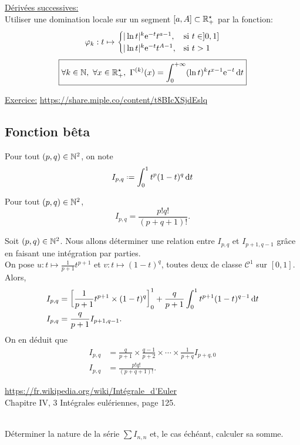 \underline{Dérivées successives:} \\
Utiliser une domination locale sur un segment $[a, A] \subset \mathbb{R}_+^\star$ par la fonction:
$$\varphi_k:t \mapsto 
\begin{cases}
    |\ln t |^k \mathrm{e}^{-t} t^{a-1}, & \text{si } t \in ]0, 1] \\
    |\ln t |^k \mathrm{e}^{-t} t^{A-1}, & \text{si } t > 1
\end{cases}
$$
$$\boxed{\forall k \in \mathbb{N},\ \forall x \in \mathbb{R}_+^\star,\ \Gamma^{(k)}(x) = \int_{0}^{+\infty} (\ln t)^k t^{x-1} \mathrm{e}^{-t} \, \mathrm{d} t}$$

\underline{Exercice:} \url{https://share.miple.co/content/t8BIcXSjdEslq}

\subsection{Fonction bêta}
\begin{defi}
    Pour tout $(p,q) \in \mathbb{N}^2$, on note
    $$I_{p,q} \defeq \int_{0}^{1} t^p (1-t)^q \d t$$
\end{defi}

\begin{prop}
    Pour tout $(p,q) \in \mathbb{N}^2$,
    $$I_{p,q} = \frac{p! q!}{(p + q + 1)!}.$$
\end{prop}

\begin{preuve}
    Soit $(p,q) \in \mathbb{N}^2$. Nous allons déterminer une relation entre $I_{p,q}$ et $I_{p+1, q-1}$ grâce en faisant une intégration par parties. \\
    On pose $u:t\mapsto \frac{1}{p+1} t^{p+1}$ et $v:t\mapsto (1-t)^q$, toutes deux de classe $\mathscr{C}^1$ sur $[0, 1]$. Alors, 
    \begin{align*}
        I_{p,q} &= \left[ \frac{1}{p+1}t^{p+1} \times (1-t)^q \right]_0^1 + \frac{q}{p+1} \int_0^1 t^{p+1} (1-t)^{q-1} \, \mathrm{d} t \\
        I_{p,q} &= \frac{q}{p+1} I_{p+1, q-1}.
    \end{align*}
    On en déduit que 
    \begin{align*}
        I_{p,q} &= \frac{q}{p+1} \times \frac{q-1}{p+2} \times \cdots \times \frac{1}{p+q} I_{p+q,0} \\
        I_{p,q} &= \frac{p! q!}{(p + q + 1)!}.
    \end{align*}
\end{preuve}

\url{https://fr.wikipedia.org/wiki/Intégrale_d'Euler} \\
\cite{calcul_infinitesimal} Chapitre IV, 3 Intégrales eulériennes, page 125.

\begin{exercice}
    \cite{acamanes} \\
    Déterminer la nature de la série $\sum I_{n,n}$ et, le cas échéant, calculer sa somme. 
\end{exercice}

\begin{solution}
\end{solution}
